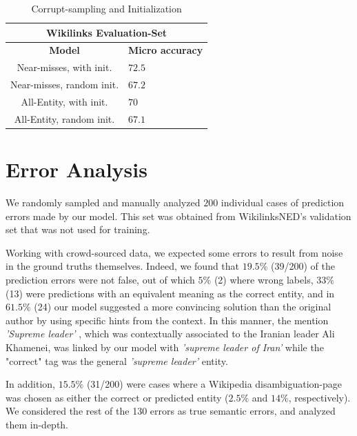 \documentclass[11pt]{article}
\begin{document}
	
	\begin{table}[ht]
		\begin{center}
			\begin{tabular}{|c| p{1.5cm}|}
				\hline \multicolumn{2}{|c|}{Wikilinks Evaluation-Set} \\
				\hline \bf Model & \bf Micro     accuracy  \\ \hline
				Near-misses, with init. & $72.5$ \\ 
				Near-misses, random init. & $67.2$ \\ 
				All-Entity, with init. & $70$ \\ 
				All-Entity, random init. & $67.1$ \\ 
				\hline
			\end{tabular}
		\end{center}
		\caption{\label{tab:c} Corrupt-sampling and Initialization}
	\end{table}
	
	
	\section{Error Analysis}
	
	We randomly sampled and manually analyzed $200$ individual cases of prediction errors made by our model. This set was obtained from WikilinksNED's validation set that was not used for training. 
	
	Working with crowd-sourced data, we expected some errors to result from noise in the ground truths themselves. Indeed, we found that $19.5$\% (39/200) of the prediction errors were not false, out of which $5\%$ (2) where wrong labels, $33\%$ (13) were predictions with an equivalent meaning as the correct entity, and in $61.5\%$ (24) our model suggested a more convincing solution than the original author by using specific hints from the context. In this manner, the  mention \textit{'Supreme leader'} , which was contextually associated to the Iranian leader Ali Khamenei, was linked by our model with \textit{'supreme leader of Iran'} while the "correct" tag was the general \textit{'supreme leader'} entity.
	
	In addition, $15.5\%$ (31/200) were cases where a Wikipedia disambiguation-page was chosen as either the correct or predicted entity ($2.5\%$ and $14\%$, respectively). We considered the rest of the 130 errors as true semantic errors, and analyzed them in-depth.
	
\end{document}

